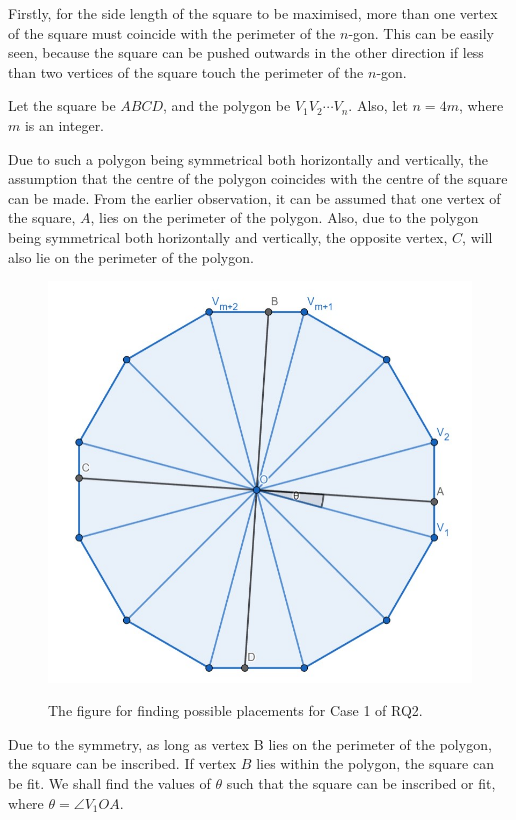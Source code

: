 \documentclass[12pt]{scrartcl}
\begin{document}
Firstly, for the side length of the square to be maximised, more than one vertex of the square must coincide with the perimeter of the $n$-gon.
This can be easily seen, because the square can be pushed outwards in the other direction if less than two vertices of the square touch the perimeter of the $n$-gon.

Let the square be $ABCD$, and the polygon be $V_{1}V_{2} \cdots V_{n}$. Also, let \(n = 4m\), where $m$ is an integer.

Due to such a polygon being symmetrical both horizontally and vertically, the assumption that the centre of the polygon coincides with the centre of the square can be made. From the earlier observation, it can be assumed that one vertex of the square, $A$, lies on the perimeter of the polygon. Also, due to the polygon being symmetrical both horizontally and vertically, the opposite vertex, $C$, will also lie on the perimeter of the polygon.

\begin{figure}[htpb]
	\centering
	\includegraphics[scale=.75]{images/rq2_1_1.jpg}
	\label{fig:rq2_1_1_img}
	\caption{The figure for finding possible placements for Case 1 of RQ2.}
\end{figure}

Due to the symmetry, as long as vertex B lies on the perimeter of the polygon, the square can be inscribed.
If vertex $B$ lies within the polygon, the square can be fit. We shall find the values of $\theta$ such that the square can be inscribed or fit,
where $\theta = \angle V_{1}OA$.
\end{document}
